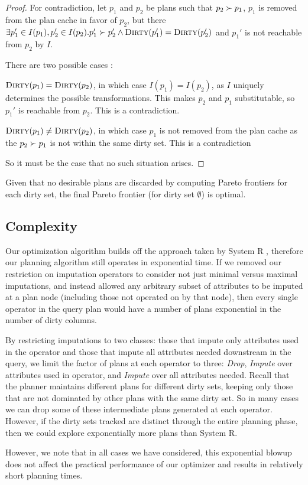\begin{proof}
For contradiction, let $p_1$ and $p_2$ be plans such that $p_2 \succ p_1$, $p_1$ is removed from the plan cache
in favor of $p_2$, but there  $\exists p_1' \in I(p_1), p_2' \in I(p_2). p_1' \succ p_2' \land \textsc{Dirty}(p_1') = \textsc{Dirty}(p_2')$
and $p_1'$ is not reachable from $p_2$ by $I$.

There are two possible cases :

\begin{case}
$\textsc{Dirty}(p_1) = \textsc{Dirty}(p_2)$, in which case $I(p_1) = I(p_2)$, as $I$ uniquely determines the possible transformations. This makes $p_2$ and $p_1$ substitutable, so $p_1'$ is reachable from $p_2$. This is a contradiction.
\end{case}

\begin{case}
$\textsc{Dirty}(p_1) \not= \textsc{Dirty}(p_2)$, in which case $p_1$ is not removed from the plan cache as the $p_2 \succ p_1$ is not within the same dirty set. This is a contradiction
\end{case}

So it must be the case that no such situation arises.
\end{proof}


Given that no desirable plans are discarded by computing Pareto frontiers for each dirty set, the final Pareto frontier (for dirty set $\emptyset$) is optimal.

\subsection{Complexity}
Our optimization algorithm builds off the approach taken by System R \cite{blasgen1981system}, therefore our planning algorithm still operates in exponential time. 
If we removed our restriction on imputation operators to consider not just minimal versus maximal imputations, and instead allowed any arbitrary subset
of attributes to be imputed at a plan node (including those not operated on by that node), then every single operator in the query plan would have a
number of plans exponential in the number of dirty columns.

By restricting imputations to two classes: those that impute only attributes used in the operator and those that impute all attributes needed downstream in the query,
we limit the factor of plans at each operator to three: \textit{Drop}, \textit{Impute} over attributes used in operator, and \textit{Impute} over all attributes needed.
Recall that the planner maintains different plans for different dirty sets, keeping only those that are not dominated by other plans with the same dirty set. So in many
cases we can drop some of these intermediate plans generated at each operator. However, if the dirty sets tracked are distinct through the entire planning phase,
then we could explore exponentially more plans than System R.

However, we note that in all cases we have considered, this exponential blowup does not affect the practical performance of our optimizer and results in relatively short
planning times.

